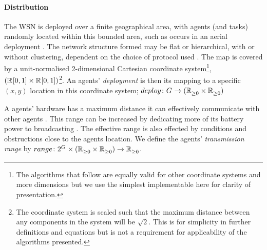 \newcommand{\formalDeployment}[2]{\functionFormal{deploy}{\setAgents{}{}}{(\setRealNumbersNonNegative{}{} \times \setRealNumbersNonNegative{}{})}}
\newcommand{\functionDeployment}[2]{
	\ifx \\1\\
	\functionSignature{deploy}{\setAgents{}{}}
	\else
	\functionSignature{deploy}{#1}
	\fi
}

\newcommand{\formalTransmissionRange}[2]{
	\functionFormal{range}
	{\powerSetAgents{}{} \times (\setRealNumbersNonNegative{}{} \times \setRealNumbersNonNegative{}{})}
	{\setRealNumbersNonNegative{}{}}
}
\newcommand{\functionTransmissionRange}[2]{\functionSignature{range}{\setAgents{}{}}}
\paragraph{Distribution}
\label{section:task_and_resources:distribution}
The WSN is deployed over a finite geographical area, with agents (and tasks) randomly located within this bounded area, such as occurs in an aerial deployment \citep{Kumar2013}.  The network structure formed may be flat or hierarchical, with or without clustering, dependent on the choice of protocol used \citep{Carlos-Mancilla2016b}. The map is covered by a unit-normalised 2-dimensional Cartesian coordinate system\footnote{The algorithms that follow are equally valid for other coordinate systems and more dimensions but we use the simplest implementable here for clarity of presentation.},  $(\mathbb{R}_{}^{}[0,1] \times \mathbb{R}_{}^{}[0,1])$\footnote{The coordinate system is scaled such that the maximum distance between any components in the system will be $\sqrt{2}$. This is for simplicity in further definitions and equations but is not a requirement for applicability of the algorithms presented.}. An agents' \textit{deployment} is then its mapping to a specific $(x, y)$ location in this coordinate system; $\formalDeployment{}{}$

A agents' hardware has a maximum distance it can effectively communicate with other agents \cite{Radman201}. This range can be increased by dedicating more of its battery power to broadcasting \cite{Padmanabh2008, Song2009}. The effective range is also effected by conditions and obstructions close to the agents location. We define the agents' \textit{transmission range} by $\formalTransmissionRange{}{}$.  


\newcommand{\formalTaskDemandPoint}[2]{
	\functionFormal{demand}
	{\setAtomicTask  {}{}}{\tupleLocation{}{}}
}
\newcommand{\functionTaskDemandPoint}[2]{\functionSignature{demand}{\varAtomicTask{}{}}}
